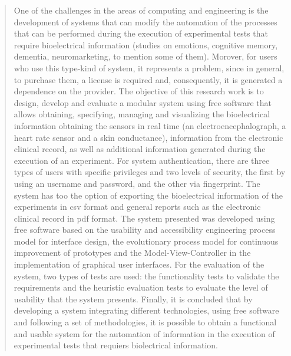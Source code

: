 \begin{abstract}
One of the challenges in the areas of computing and engineering is the development of systems that can modify the automation of the processes that can be performed during the execution of experimental tests that require bioelectrical information (studies on emotions, cognitive memory, dementia, neuromarketing, to mention some of them). Morover, for users who use this type-kind of system, it represents a problem, since in general, to purchase them, a license is required and, consequently, it is generated a dependence on the provider. The objective of this research work is to design, develop and evaluate a modular system using free software that allows obtaining, specifying, managing and visualizing the bioelectrical information obtaining the sensors in real time (an electroencephalograph, a heart rate sensor and a skin conductance), information from the electronic clinical record, as well as additional information generated during the execution of an experiment. For system authentication, there are three types of users with speciﬁc privileges and two levels of security, the first by using an username and password, and the other via ﬁngerprint. The system has too the option of exporting the bioelectrical information of the experiments in csv format and general reports such as the electronic clinical record in pdf format. The system presented was developed using free software based on the usability and accessibility engineering process model for interface design, the evolutionary process model for continuous improvement of prototypes and the Model-View-Controller in the implementation of graphical user interfaces. For the evaluation of the system, two types of tests are used: the functionality tests to validate the requirements and the heuristic evaluation tests to evaluate the level of usability that the system presents. Finally, it is concluded that by developing a system integrating diﬀerent technologies, using free software and following a set of methodologies, it is possible to obtain a functional and usable system for the automation of information in the execution of experimental tests that requiers biolectrical information.

\end{abstract}
